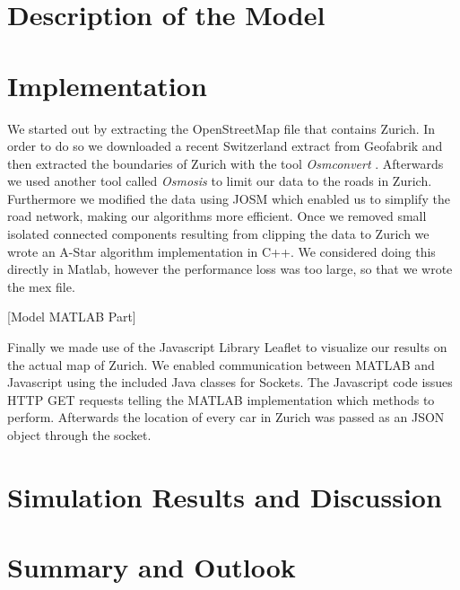 \documentclass[11pt]{article}
\begin{document}
\section{Description of the Model}

\section{Implementation}
We started out by extracting the OpenStreetMap file that contains Zurich.
In order to do so we downloaded a recent Switzerland extract from Geofabrik \cite{geofab} and then extracted the boundaries of Zurich with the tool \emph{Osmconvert} \cite{osmconv}.
Afterwards we used another tool called \emph{Osmosis} to limit our data to the roads in Zurich.
Furthermore we modified the data using JOSM which enabled us to simplify the road network, making our algorithms more efficient.
Once we removed small isolated connected components resulting from clipping the data to Zurich we wrote an A-Star algorithm implementation in C++.
We considered doing this directly in Matlab, however the performance loss was too large, so that we wrote the mex file.

[Model MATLAB Part]



Finally we made use of the Javascript Library Leaflet to visualize our results on the actual map of Zurich.
We enabled communication between MATLAB and Javascript using the included Java classes for Sockets.
The Javascript code issues HTTP GET requests telling the MATLAB implementation which methods to perform.
Afterwards the location of every car in Zurich was passed as an JSON object through the socket.


\section{Simulation Results and Discussion}

\section{Summary and Outlook}


\newpage
\printbibliography
\end{document}

